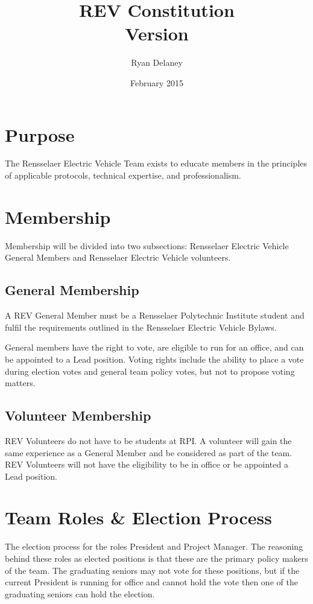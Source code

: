 \documentclass{article}
\title{REV Constitution \\\normalsize Version \version}
\author{Ryan Delaney}
\date{February 2015}
\begin{document}
\maketitle
\newpage
\tableofcontents
\newpage

\section{Purpose}
\label{purpose}
The Rensselaer Electric Vehicle Team exists to educate members in the principles of applicable protocols, technical expertise, and professionalism.

\section{Membership}
\label{membership}
Membership will be divided into two subsections: Rensselaer Electric Vehicle General Members and Rensselaer Electric Vehicle volunteers.

\subsection{General Membership}
\label{membership:general}
A REV General Member must be a Rensselaer Polytechnic Institute student and fulfil the requirements outlined in the Rensselaer Electric Vehicle Bylaws.

General members have the right to vote, are eligible to run for an office, and can be appointed to a Lead position. Voting rights include the ability to place a vote during election votes and general team policy votes, but not to propose voting matters.

\subsection{Volunteer Membership}
\label{membership:volunteer}
REV Volunteers do not have to be students at RPI. A volunteer will gain the same experience as a General Member and be considered as part of the team. REV Volunteers will not have the eligibility to be in office or be appointed a Lead position.

\section{Team Roles \& Election Process}
\label{roles}
The election process for the roles President and Project Manager. The reasoning behind these roles as elected positions is that these are the primary policy makers of the team. The graduating seniors may not vote for these positions, but if the current President is running for office and cannot hold the vote then one of the graduating seniors can hold the election.
\end{document}

